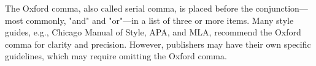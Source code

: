 


\noindent The Oxford comma, also called serial comma, is placed before the conjunction---most commonly, "and" and "or"---in a list of three or more items.
Many style guides, e.g., Chicago Manual of Style, APA, and MLA, recommend the Oxford comma for clarity and precision.
However, publishers may have their own specific guidelines, which may require omitting the Oxford comma.

